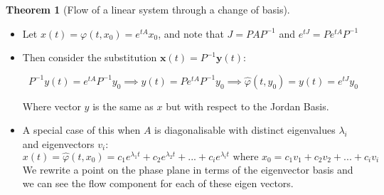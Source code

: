 \documentclass{article}
\newtheorem{thm}{Theorem}[section]
\begin{document}
\begin{thm}[Flow of a linear system through a change of basis]
\end{thm}
\begin{itemize}
    \item Let $ x(t) = \varphi(t, {x_0})= e^{tA} x_0$, and note that $J = PAP^{-1}$ and  $e^{tJ} = Pe^{tA}P^{-1}$
    
    \item Then consider the substitution $\mathbf{x}(t) = P^{-1} \mathbf{y}(t)$:

    \[P^{-1}y(t) = e^{tA}P^{-1} y_0 \implies y(t) = Pe^{tA}P^{-1} y_0 \implies \hat{\varphi}(t, y_0) = y(t) = e^{tJ}y_0\]

    Where vector $y$ is the same as $x$ but with respect to the Jordan Basis.

    \item A special case of this when $A$ is diagonalisable with distinct eigenvalues $\lambda_i$ and eigenvectors $v_i$:
    \[x(t) = \hat{\varphi}(t, x_0) = c_1e^{\lambda_1 t} + c_2e^{\lambda_2 t} + ... + c_ie^{\lambda_i t} \text{ where $x_0 = c_1v_1 + c_2v_2 + ... + c_iv_i$}\]
    We rewrite a point on the phase plane in terms of the eigenvector basis and we can see the flow component for each of these eigen vectors.
    
\end{itemize}
\end{document}
